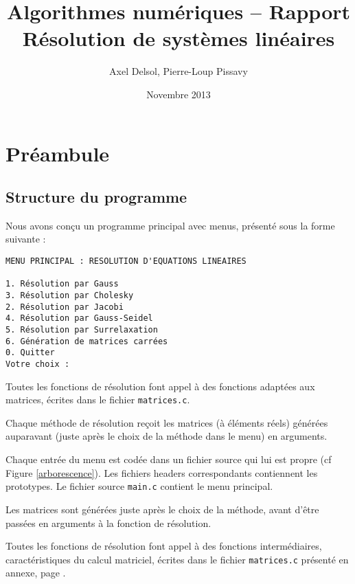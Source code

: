 \documentclass{report}
\title{Algorithmes numériques -- Rapport \\ \vspace{0.5cm}Résolution de systèmes linéaires}
\author{Axel Delsol, Pierre-Loup Pissavy}
\date{Novembre 2013}
\begin{document}
  \maketitle
  \tableofcontents

  \chapter{Préambule}
  	\section{Structure du programme}
    Nous avons conçu un programme principal avec menus, présenté sous la forme suivante :

    \begin{lstlisting}[style=apercu, name=Menu Principal]
MENU PRINCIPAL : RESOLUTION D'EQUATIONS LINEAIRES

1. Résolution par Gauss
3. Résolution par Cholesky
2. Résolution par Jacobi
4. Résolution par Gauss-Seidel
5. Résolution par Surrelaxation
6. Génération de matrices carrées
0. Quitter
Votre choix : 
	\end{lstlisting}
	
	Toutes les fonctions de résolution font appel à des fonctions adaptées aux matrices, écrites dans le fichier \verb"matrices.c".
    \vspace{0.3cm}
    
    Chaque méthode de résolution reçoit les matrices (à éléments réels) générées auparavant (juste après le choix de la méthode dans le menu) en arguments.
    \vspace{0.3cm}
    	
	Chaque entrée du menu est codée dans un fichier source qui lui est propre (cf Figure \ref{arborescence}). Les fichiers headers correspondants contiennent les prototypes. Le fichier source \verb"main.c" contient le menu principal.
	\vspace{0.3cm}
	
    Les matrices sont générées juste après le choix de la méthode, avant d'être passées en arguments à la fonction de résolution.

    
    \vspace{0.3cm}

  Toutes les fonctions de résolution font appel à des fonctions intermédiaires, caractéristiques du calcul matriciel, écrites dans le fichier \verb"matrices.c" présenté en annexe, page \pageref{sourceMatrices}.
  
\end{document}
